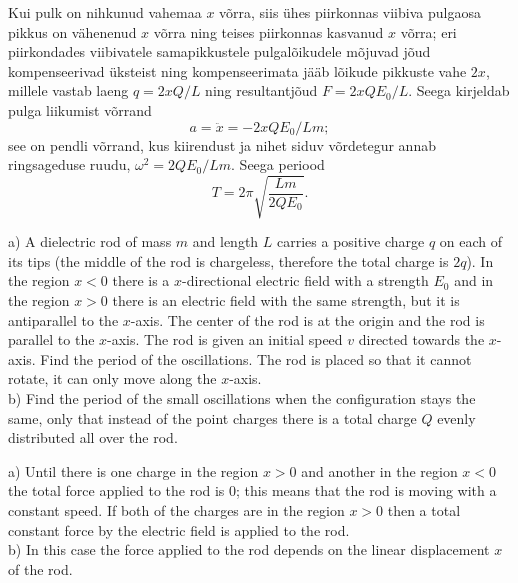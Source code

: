\osa Kui pulk on nihkunud vahemaa $x$ võrra, siis ühes piirkonnas viibiva pulgaosa pikkus
on vähenenud $x$ võrra ning teises piirkonnas kasvanud $x$ võrra; eri piirkondades viibivatele
samapikkustele pulgalõikudele mõjuvad jõud kompenseerivad üksteist ning kompenseerimata jääb lõikude pikkuste vahe $2x$, millele vastab laeng
$q=2xQ/L$ ning resultantjõud $F=2xQE_0/L$.
Seega kirjeldab pulga liikumist võrrand
\[
a=\ddot x= -2xQE_0/Lm;
\]
see on pendli võrrand, kus kiirendust ja nihet siduv võrdetegur annab ringsageduse ruudu,
$\omega^2=2QE_0/Lm$. Seega periood 
\[ T=2\pi\sqrt{\frac{Lm}{2QE_0}}.\]

a) A dielectric rod of mass $m$ and length $L$ carries a positive charge $q$ on each of its tips (the middle of the rod is chargeless, therefore the total charge is $2q$). In the region $x<0$ there is a $x$-directional electric field with a strength $E_0$ and in the region $x>0$ there is an electric field with the same strength, but it is antiparallel to the $x$-axis. The center of the rod is at the origin and the rod is parallel to the $x$-axis. The rod is given an initial speed $v$ directed towards the $x$-axis. Find the period of the oscillations. The rod is placed so that it cannot rotate, it can only move along the $x$-axis.\\
b) Find the period of the small oscillations when the configuration stays the same, only that instead of the point charges there is a total charge $Q$ evenly distributed all over the rod.

\hinteng
a) Until there is one charge in the region $x>0$ and another in the region $x<0$ the total force applied to the rod is 0; this means that the rod is moving with a constant speed. If both of the charges are in the region $x>0$ then a total constant force by the electric field is applied to the rod.\\
b) In this case the force applied to the rod depends on the linear displacement $x$ of the rod.

